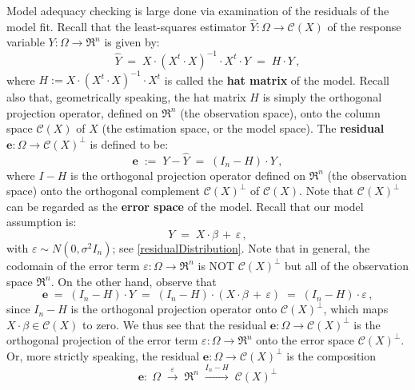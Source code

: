 \documentclass{article}
\begin{document}
Model adequacy checking is large done via examination of the residuals of the model fit.
Recall that the least-squares estimator $\widehat{Y}  : \Omega \longrightarrow \mathcal{C}(X)$
of the response variable $Y : \Omega \longrightarrow \Re^{n}$
is given by:
\begin{equation*}
\widehat{Y} \; = \; X\cdot\left(X^{t}\cdot X\right)^{-1}\cdot X^{t} \cdot Y \; = \; H \cdot Y\,,
\end{equation*}
where $H := X\cdot\left(X^{t}\cdot X\right)^{-1}\cdot X^{t}$ is called the \textbf{hat matrix}
of the model. Recall also that, geometrically speaking, the hat matrix $H$ is simply the orthogonal
projection operator, defined on $\Re^{n}$ (the observation space), onto the column space
$\mathcal{C}(X)$ of $X$ (the estimation space, or the model space).
The \textbf{residual} $\mathbf{e} : \Omega \longrightarrow \mathcal{C}(X)^{\perp}$ is defined to be:
\begin{equation*}
\mathbf{e}
\; := \; Y - \widehat{Y}
\;  = \; \left(I_{n} - H\right) \cdot Y\,,
\end{equation*}
where $I - H$ is the orthogonal projection operator defined on $\Re^{n}$ (the observation space)
onto the orthogonal complement $\mathcal{C}(X)^{\perp}$ of $\mathcal{C}(X)$.
Note that $\mathcal{C}(X)^{\perp}$ can be regarded as the \textbf{error space} of the model.
Recall that our model assumption is:
\begin{equation*}
Y \; = \; X\cdot\beta \, + \, \varepsilon\,,
\end{equation*}
with $\varepsilon \sim N\!\left(0,\sigma^{2}I_{n}\right)$; see \eqref{residualDistribution}.
Note that in general, the codomain of the error term $\varepsilon : \Omega \longrightarrow \Re^{n}$
is NOT $\mathcal{C}(X)^{\perp}$ but all of the observation space $\Re^{n}$.
On the other hand, observe that
\begin{equation*}
\mathbf{e}
\; = \; \left(I_{n} - H\right)\cdot Y 
\; = \; \left(I_{n} - H\right)\cdot \left(X\cdot\beta \, + \, \varepsilon\right)
\; = \; \left(I_{n} - H\right)\cdot \varepsilon\,,
\end{equation*}
since $I_{n} - H$ is the orthogonal projection operator onto $\mathcal{C}(X)^{\perp}$, which maps
$X\cdot\beta \in \mathcal{C}(X)$ to zero.
We thus see that the residual $\mathbf{e} : \Omega \longrightarrow \mathcal{C}(X)^{\perp}$ is the
orthogonal projection of the error term $\varepsilon : \Omega \longrightarrow \Re^{n}$ onto the
error space $\mathcal{C}(X)^{\perp}$.
Or, more strictly speaking, the residual $\mathbf{e} : \Omega \longrightarrow \mathcal{C}(X)^{\perp}$
is the composition
\begin{equation*}
\mathbf{e} :
\;\Omega
\;\overset{\varepsilon}{\longrightarrow} \; \Re^{n}
\;\overset{I_{n}-H}{\longrightarrow} \; \mathcal{C}(X)^{\perp}
\end{equation*}
\end{document}
